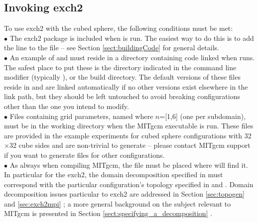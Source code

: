 \subsection{Invoking exch2}

To use exch2 with the cubed sphere, the following conditions must be
met: \\

$\bullet$ The exch2 package is included when  is run.
  The easiest way to do this is to add the line  to the
   file -- see Section
  \ref{sect:buildingCode}  for general
  details. \\

$\bullet$ An example of  and
   must reside in a directory containing code
  linked when  runs.  The safest place to put these
  is the directory indicated in the  command line
  modifier (typically ), or the build directory.  The
  default versions of these files reside in  and are
  linked automatically if no other versions exist elsewhere in the
  link path, but they should be left untouched to avoid breaking
  configurations other than the one you intend to modify.\\

$\bullet$ Files containing grid parameters, named
   where $n$=[1,6] (one per subdomain), must
  be in the working directory when the MITgcm executable is run.
  These files are provided in the example experiments for cubed sphere
  configurations with 32$\times$32 cube sides and are non-trivial to
  generate -- please contact MITgcm support if you want to generate
  files for other configurations. \\

$\bullet$ As always when compiling MITgcm, the file  must
  be placed where  will find it.  In particular for the
  exch2, the domain decomposition specified in  must
  correspond with the particular configuration's topology specified in
   and .  Domain
  decomposition issues particular to exch2 are addressed in Section
  \ref{sec:topogen} 
  and \ref{sec:exch2mpi} ; a more
  general background on the subject relevant to MITgcm is presented in
  Section \ref{sect:specifying_a_decomposition}
  .\\

